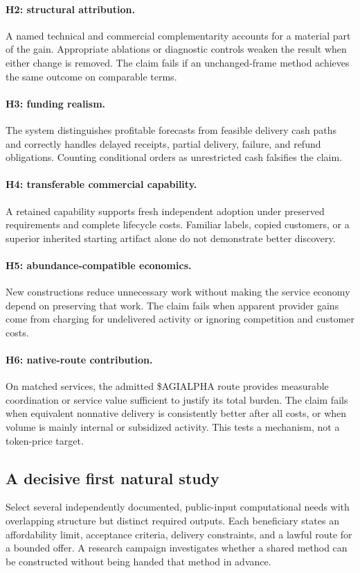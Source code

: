\documentclass[11pt,letterpaper]{article}
\theoremstyle{remark}\newtheorem{remark}{Remark}[section]
\begin{document}
\paragraph{H2: structural attribution.} A named technical and commercial complementarity accounts for a material part of the gain. Appropriate ablations or diagnostic controls weaken the result when either change is removed. The claim fails if an unchanged-frame method achieves the same outcome on comparable terms.
\paragraph{H3: funding realism.} The system distinguishes profitable forecasts from feasible delivery cash paths and correctly handles delayed receipts, partial delivery, failure, and refund obligations. Counting conditional orders as unrestricted cash falsifies the claim.
\paragraph{H4: transferable commercial capability.} A retained capability supports fresh independent adoption under preserved requirements and complete lifecycle costs. Familiar labels, copied customers, or a superior inherited starting artifact alone do not demonstrate better discovery.
\paragraph{H5: abundance-compatible economics.} New constructions reduce unnecessary work without making the service economy depend on preserving that work. The claim fails when apparent provider gains come from charging for undelivered activity or ignoring competition and customer costs.
\paragraph{H6: native-route contribution.} On matched services, the admitted \$AGIALPHA route provides measurable coordination or service value sufficient to justify its total burden. The claim fails when equivalent nonnative delivery is consistently better after all costs, or when volume is mainly internal or subsidized activity. This tests a mechanism, not a token-price target.

\subsection{A decisive first natural study}
Select several independently documented, public-input computational needs with overlapping structure but distinct required outputs. Each beneficiary states an affordability limit, acceptance criteria, delivery constraints, and a lawful route for a bounded offer. A research campaign investigates whether a shared method can be constructed without being handed that method in advance.
\end{document}
